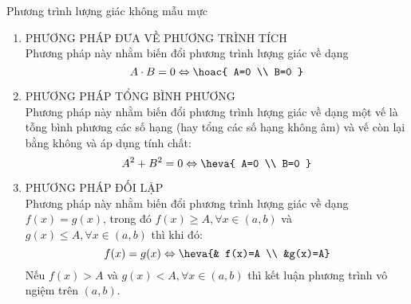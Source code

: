 \begin{dang}{Phương trình lượng giác không mẫu mực}
	\begin{enumerate}
		\item PHƯƠNG PHÁP  ĐƯA VỀ PHƯƠNG TRÌNH TÍCH\\
		Phương pháp này nhằm biến đổi phương trình lượng giác về dạng 
		$$
		A\cdot B=0 \Leftrightarrow\hoac{
			A=0 \\
			B=0
		}
		$$	
		\item PHƯƠNG PHÁP TỔNG BÌNH PHƯƠNG\\
		Phương pháp này nhằm biến đổi phương trình lượng giác về dạng một vế là tỗng bình phương các số hạng (hay tổng các số hạng không âm) và vế còn lại bằng không và áp dụng tính chất:
		$$
		A^2+B^2=0 \Leftrightarrow\heva{
			A=0 \\
			B=0
		}
		$$	
		\item PHƯƠNG PHÁP ĐỐI LẬP\\
		Phương pháp này nhằm biến đổi phương trình lượng giác về dạng $f(x)=g(x)$, trong đó  $f(x) \geq A, \forall x \in(a, b)$ và $g(x) \leq A, \forall x \in(a, b)$ thì khi đó:
		$$
		f(x)=g(x) \Leftrightarrow\heva{&
			f(x)=A \\
			&g(x)=A}
		$$
		Nếu  $f(x)>A$ và $g(x)<A, \forall x \in(a, b)$ thì kết luận phương trình vô ngiệm trên $(a, b)$.
		
	\end{enumerate}
	
	
\end{dang}
